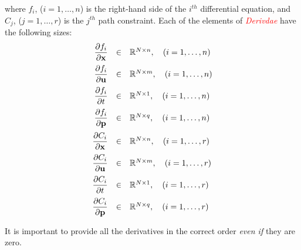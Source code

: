 \documentclass[10pt]{article}
\newcommand{\slred}[1]{\textcolor{red}{\sl #1}}
\begin{document}
where $f_i$, ($i = 1,\ldots,n$) is the right-hand side of the
$i^{th}$ differential equation, and $C_j$, ($j = 1,\ldots,r$) is
the $j^{th}$ path constraint.  Each of the elements of \slred{Derivdae}
have the following sizes:
\begin{equation}
  \begin{array}{rcl}
\displaystyle    \pd{f_i}{\bfx} & \in & \mathbb{R}^{N\times n}, \quad (i=1,\ldots,n)\vspace{6pt} \\
\displaystyle   \pd{f_i}{\bfu} & \in & \mathbb{R}^{N\times m}, \quad (i=1,\ldots,n) \vspace{6pt} \\
\displaystyle   \pd{f_i}{t} & \in & \mathbb{R}^{N\times 1}, \quad (i=1,\ldots,n) \vspace{6pt}\\
\displaystyle   \pd{f_i}{\bfp} & \in & \mathbb{R}^{N\times q}, \quad (i=1,\ldots,n) \vspace{6pt}\\
\displaystyle    \pd{C_i}{\bfx} & \in & \mathbb{R}^{N\times n}, \quad (i=1,\ldots,r) \vspace{6pt}\\
\displaystyle   \pd{C_i}{\bfu} & \in & \mathbb{R}^{N\times m}, \quad (i=1,\ldots,r) \vspace{6pt}\\
\displaystyle   \pd{C_i}{t} & \in & \mathbb{R}^{N\times 1}, \quad (i=1,\ldots,r) \vspace{6pt}\\
\displaystyle   \pd{C_i}{\bfp} & \in & \mathbb{R}^{N\times q}, \quad (i=1,\ldots,r) 
 \end{array}
\end{equation}

It is important to provide all the
derivatives in the correct order {\em even if} they are zero. 
\end{document}
